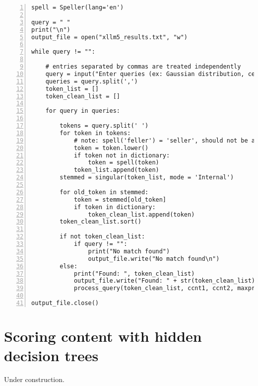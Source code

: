 \documentclass[oneside,10pt]{book}
\begin{document}
\begin{lstlisting}[numbers=left]
spell = Speller(lang='en')

query = " "
print("\n")
output_file = open("xllm5_results.txt", "w")

while query != "":  

    # entries separated by commas are treated independently
    query = input("Enter queries (ex: Gaussian distribution, central moments): ") 
    queries = query.split(',')
    token_list = []
    token_clean_list = []

    for query in queries:

        tokens = query.split(' ')
        for token in tokens:
            # note: spell('feller') = 'seller', should not be autocorrected
            token = token.lower()
            if token not in dictionary:
                token = spell(token) 
            token_list.append(token)
        stemmed = singular(token_list, mode = 'Internal')   

        for old_token in stemmed:
            token = stemmed[old_token]
            if token in dictionary:
                token_clean_list.append(token)
        token_clean_list.sort()

        if not token_clean_list: 
            if query != "":
                print("No match found")
                output_file.write("No match found\n")
        else:
            print("Found: ", token_clean_list) 
            output_file.write("Found: " + str(token_clean_list) + "\n") 
            process_query(token_clean_list, ccnt1, ccnt2, maxprint, output_file)

output_file.close()

\end{lstlisting}


\section{Scoring content with hidden decision trees}

Under construction.



\end{document}
